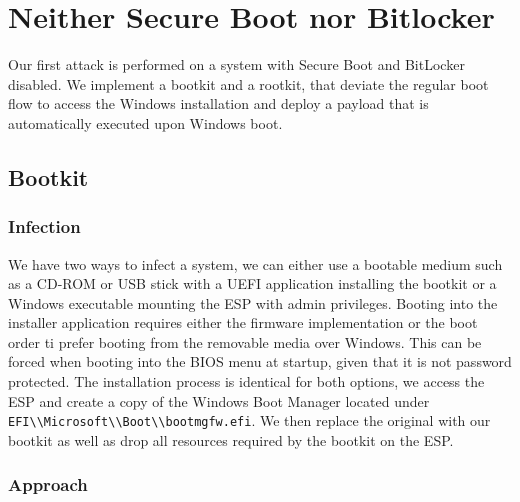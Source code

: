 
\section{Neither Secure Boot nor Bitlocker}

Our first attack is performed on a system with Secure Boot and BitLocker disabled.
We implement a bootkit and a rootkit, that deviate the regular boot flow to access the Windows installation and deploy a payload that is automatically executed upon Windows boot.

\subsection{Bootkit}

\subsubsection{Infection}


We have two ways to infect a system, we can either use a bootable medium such as a CD-ROM or \ac{USB} stick with a \ac{UEFI} application installing the bootkit or a Windows executable mounting the \ac{ESP} with admin privileges. Booting into the installer application requires either the firmware implementation or the boot order ti prefer booting from the removable media over Windows.
This can be forced when booting into the \ac{BIOS} menu at startup, given that it is not password protected.
The installation process is identical for both options, we access the \ac{ESP} and create a copy of the Windows Boot Manager located under \lstinline{EFI\\Microsoft\\Boot\\bootmgfw.efi}.
We then replace the original with our bootkit as well as drop all resources required by the bootkit on the \ac{ESP}.

\subsubsection{Approach}

